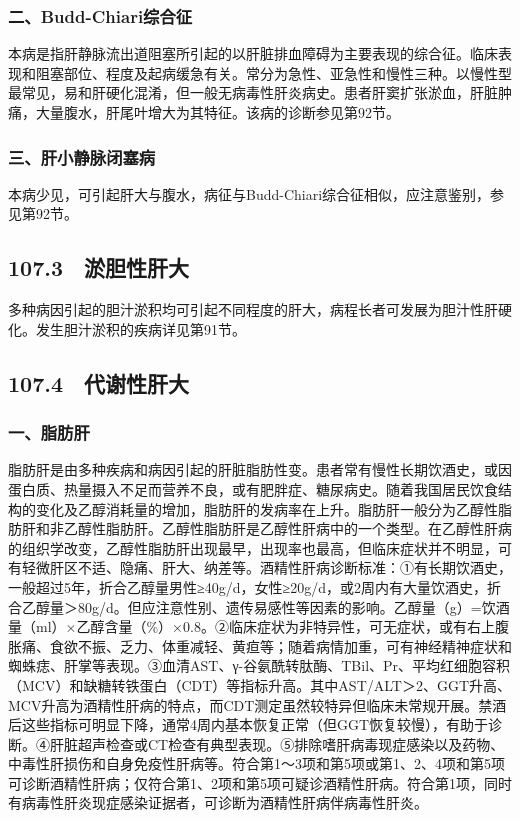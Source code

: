 \subsubsection{二、Budd-Chiari综合征}

本病是指肝静脉流出道阻塞所引起的以肝脏排血障碍为主要表现的综合征。临床表现和阻塞部位、程度及起病缓急有关。常分为急性、亚急性和慢性三种。以慢性型最常见，易和肝硬化混淆，但一般无病毒性肝炎病史。患者肝窦扩张淤血，肝脏肿痛，大量腹水，肝尾叶增大为其特征。该病的诊断参见第92节。

\subsubsection{三、肝小静脉闭塞病}

本病少见，可引起肝大与腹水，病征与Budd-Chiari综合征相似，应注意鉴别，参见第92节。

\subsection{107.3　淤胆性肝大}

多种病因引起的胆汁淤积均可引起不同程度的肝大，病程长者可发展为胆汁性肝硬化。发生胆汁淤积的疾病详见第91节。

\subsection{107.4　代谢性肝大}

\subsubsection{一、脂肪肝}

脂肪肝是由多种疾病和病因引起的肝脏脂肪性变。患者常有慢性长期饮酒史，或因蛋白质、热量摄入不足而营养不良，或有肥胖症、糖尿病史。随着我国居民饮食结构的变化及乙醇消耗量的增加，脂肪肝的发病率在上升。脂肪肝一般分为乙醇性脂肪肝和非乙醇性脂肪肝。乙醇性脂肪肝是乙醇性肝病中的一个类型。在乙醇性肝病的组织学改变，乙醇性脂肪肝出现最早，出现率也最高，但临床症状并不明显，可有轻微肝区不适、隐痛、肝大、纳差等。酒精性肝病诊断标准：①有长期饮酒史，一般超过5年，折合乙醇量男性≥40g/d，女性≥20g/d，或2周内有大量饮酒史，折合乙醇量＞80g/d。但应注意性别、遗传易感性等因素的影响。乙醇量（g）=饮酒量（ml）×乙醇含量（\%）×0.8。②临床症状为非特异性，可无症状，或有右上腹胀痛、食欲不振、乏力、体重减轻、黄疸等；随着病情加重，可有神经精神症状和蜘蛛痣、肝掌等表现。③血清AST、γ-谷氨酰转肽酶、TBil、Pr、平均红细胞容积（MCV）和缺糖转铁蛋白（CDT）等指标升高。其中AST/ALT＞2、GGT升高、MCV升高为酒精性肝病的特点，而CDT测定虽然较特异但临床未常规开展。禁酒后这些指标可明显下降，通常4周内基本恢复正常（但GGT恢复较慢），有助于诊断。④肝脏超声检查或CT检查有典型表现。⑤排除嗜肝病毒现症感染以及药物、中毒性肝损伤和自身免疫性肝病等。符合第1～3项和第5项或第1、2、4项和第5项可诊断酒精性肝病；仅符合第1、2项和第5项可疑诊酒精性肝病。符合第1项，同时有病毒性肝炎现症感染证据者，可诊断为酒精性肝病伴病毒性肝炎。

